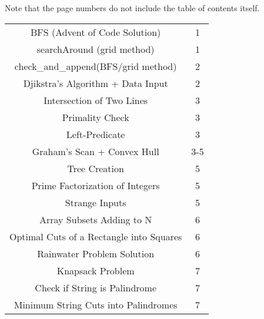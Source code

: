 \documentclass[]{article}
\begin{document}
\centering
Note that the page numbers do not include the table of contents itself.
\begin{tabular}{c c}
BFS (Advent of Code Solution) & 1\\
searchAround (grid method) & 1\\
check\_and\_append(BFS/grid method) & 2\\
Djikstra's Algorithm + Data Input & 2\\
Intersection of Two Lines & 3\\
Primality Check & 3\\
Left-Predicate & 3\\
Graham's Scan + Convex Hull & 3-5\\
Tree Creation & 5\\
Prime Factorization of Integers & 5\\
Strange Inputs & 5\\
Array Subsets Adding to N & 6\\
Optimal Cuts of a Rectangle into Squares & 6\\
Rainwater Problem Solution & 6\\
Knapsack Problem & 7\\
Check if String is Palindrome & 7\\
Minimum String Cuts into Palindromes & 7\\


\end{tabular}
\end{document}
